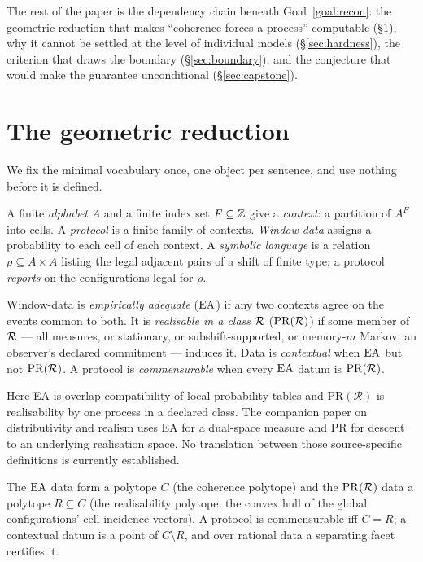 The rest of the paper is the dependency chain beneath
Goal~\ref{goal:recon}: the geometric reduction that makes ``coherence forces a
process'' computable (\S\ref{sec:geometry}), why it cannot be settled at the level
of individual models (\S\ref{sec:hardness}), the criterion that draws the boundary
(\S\ref{sec:boundary}), and the conjecture that would make the guarantee
unconditional (\S\ref{sec:capstone}).


\section{The geometric reduction}\label{sec:geometry}

We fix the minimal vocabulary once, one object per sentence, and use nothing before
it is defined.

A finite \emph{alphabet} $A$ and a finite index set $F\subseteq\mathbb{Z}$ give a
\emph{context}: a partition of $A^F$ into cells. A \emph{protocol} is a finite
family of contexts. \emph{Window-data} assigns a probability to each cell of each
context. A \emph{symbolic language} is a relation $\rho\subseteq A\times A$ listing
the legal adjacent pairs of a shift of finite type; a protocol \emph{reports} on
the configurations legal for $\rho$.

\begin{definition}\label{def:core}
Window-data is \emph{empirically adequate} ($\mathrm{EA}$) if any two contexts agree on the
events common to both. It is \emph{realisable in a class} $\mathcal{R}$ ($\mathrm{PR}(\mathcal{R})$) if some
member of $\mathcal{R}$ --- all measures, or stationary, or subshift-supported, or
memory-$m$ Markov: an observer's declared commitment --- induces it. Data is
\emph{contextual} when $\mathrm{EA}$ but not $\mathrm{PR}(\mathcal{R})$. A protocol is \emph{commensurable}
when every $\mathrm{EA}$ datum is $\mathrm{PR}(\mathcal{R})$.
\end{definition}

\begin{remark}
Here EA is overlap compatibility of local probability tables and
$\mathrm{PR}(\mathcal R)$ is realisability by one process in a declared class.
The companion paper on distributivity and realism uses EA for a dual-space
measure and PR for descent to an underlying realisation space. No translation
between those source-specific definitions is currently established.
\end{remark}

\begin{proposition}\label{prop:cr}
The $\mathrm{EA}$ data form a polytope $C$ (the coherence polytope) and the $\mathrm{PR}(\mathcal{R})$ data
a polytope $R\subseteq C$ (the realisability polytope, the convex hull of the global
configurations' cell-incidence vectors). A protocol is commensurable iff $C=R$; a
contextual datum is a point of $C\setminus R$, and over rational data a separating
facet certifies it.
\end{proposition}

